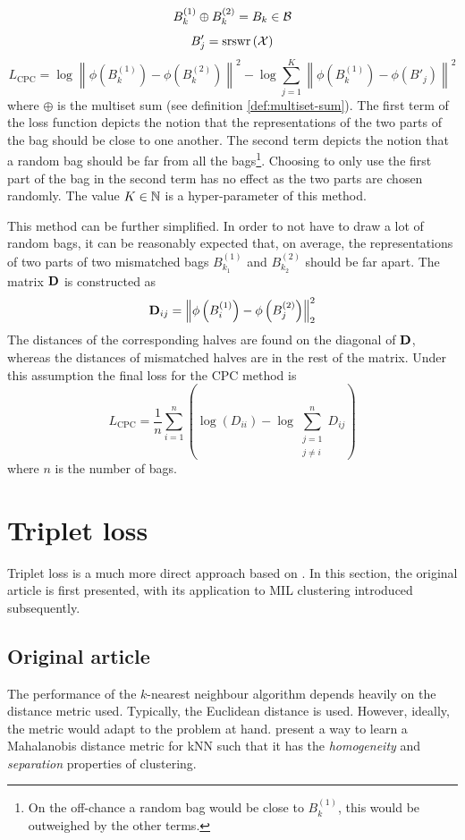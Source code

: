 \[ B_k^{(1)} \oplus B_k^{(2)} = B_k \in \mathcal{B} \]
\[ B'_j = \mathrm{srswr} \left( \mathcal{X} \right) \]
\[ L_\mathrm{CPC} = \log \left\lVert \phi \left( B_k^{(1)} \right) - \phi \left( B_k^{(2)} \right) \right\rVert^2 - \log \sum_{j = 1}^K \left\lVert \phi \left( B_k^{(1)} \right) - \phi \left( B'_j \right) \right\rVert^2 \]
where \( \oplus \) is the multiset sum (see definition \ref{def:multiset-sum}). The first term of the loss function depicts the notion that the representations of the two parts of the bag should be close to one another. The second term depicts the notion that a random bag should be far from all the bags\footnote{On the off-chance a random bag would be close to \( B_k^{(1)} \), this would be outweighed by the other terms.}. Choosing to only use the first part of the bag in the second term has no effect as the two parts are chosen randomly. The value \( K \in \mathbb{N} \) is a hyper-parameter of this method.

This method can be further simplified. In order to not have to draw a lot of random bags, it can be reasonably expected that, on average, the representations of two parts of two mismatched bags \( B_{k_1}^{(1)} \) and \( B_{k_2}^{(2)} \) should be far apart. The matrix \( \mathbf{D} \) is constructed as
\[ \mathbf{D}_{ij} = \left\lVert \phi \left( B_i^{(1)} \right) - \phi \left( B_j^{(2)} \right) \right\rVert_2^2 \]
The distances of the corresponding halves are found on the diagonal of \( \mathbf{D} \), whereas the distances of mismatched halves are in the rest of the matrix. Under this assumption the final loss for the CPC method is
\[ L_\mathrm{CPC} = \frac{1}{n} \sum_{i = 1}^n \left( \log \left( D_{ii} \right) - \log \sum_{\substack{j = 1 \\ j \neq i}}^n D_{ij} \right) \]
where \( n \) is the number of bags.

\section{Triplet loss}
Triplet loss is a much more direct approach based on \cite{weinberger_distance_2006}. In this section, the original article is first presented, with its application to MIL clustering introduced subsequently.

\subsection{Original article}
The performance of the \( k \)-nearest neighbour algorithm depends heavily on the distance metric used. Typically, the Euclidean distance is used. However, ideally, the metric would adapt to the problem at hand. \cite{weinberger_distance_2006} present a way to learn a Mahalanobis distance metric for kNN such that it has the \textit{homogeneity} and \textit{separation} properties of clustering.

